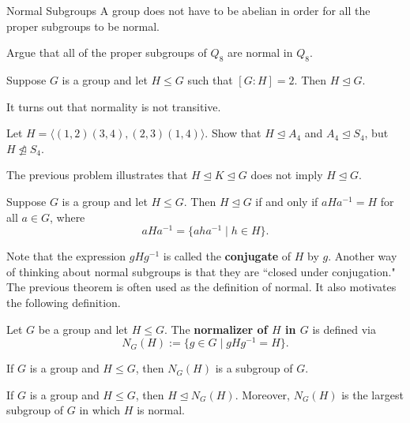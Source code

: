 \begin{section}{Normal Subgroups}
A group does not have to be abelian in order for all the proper subgroups to be normal.

\begin{problem}
Argue that all of the proper subgroups of \(Q_8\) are normal in \(Q_8\). 
\end{problem}

\begin{theorem}\label{thm:index2}
Suppose \(G\) is a group and let \(H\leq G\) such that \([G:H]=2\).  Then \(H\trianglelefteq G\).
\end{theorem}

It turns out that normality is not transitive.

\begin{problem}
Let \(H=\langle (1,2)(3,4),(2,3)(1,4)\rangle\).  Show that \(H\trianglelefteq A_4\) and \(A_4\trianglelefteq S_4\), but \(H\not\trianglelefteq S_4\).
\end{problem}

The previous problem illustrates that \(H\trianglelefteq K \trianglelefteq G\) does not imply \(H\trianglelefteq G\).

\begin{theorem}
Suppose \(G\) is a group and let \(H\leq G\).  Then \(H\trianglelefteq G\) if and only if \(aHa^{-1}=H\) for all \(a\in G\), where
\[
aHa^{-1}=\{aha^{-1}\mid h\in H\}.
\]
\end{theorem}

Note that the expression \(gHg^{-1}\) is called the \textbf{conjugate} of \(H\) by \(g\).  Another way of thinking about normal subgroups is that they are ``closed under conjugation." The previous theorem is often used as the definition of normal.  It also motivates the following definition.

\begin{definition}
Let \(G\) be a group and let \(H\leq G\).  The \textbf{normalizer of \(H\) in \(G\)} is defined via
\[
N_G(H):=\{g\in G\mid gHg^{-1}=H\}.
\]
\end{definition}

\begin{theorem}
If \(G\) is a group and \(H\leq G\), then \(N_G(H)\) is a subgroup of \(G\).
\end{theorem}

\begin{theorem}
If \(G\) is a group and \(H\leq G\), then \(H\trianglelefteq N_G(H)\).  Moreover, \(N_G(H)\) is the largest subgroup of \(G\) in which \(H\) is normal. 
\end{theorem}


\end{section}

